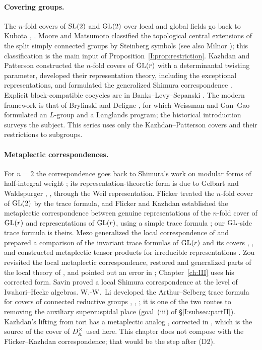 \paragraph{Covering groups.} The $n$-fold covers of $\mathrm{SL}(2)$ and $\operatorname{GL}(2)$ over local and global fields go back to Kubota \cite{Kub67}, \cite{Kub69}. Moore \cite{Moo68} and Matsumoto \cite{Mat69} classified the topological central extensions of the split simply connected groups by Steinberg symbols (see also Milnor \cite{Mil71}); this classification is the main input of Proposition~\ref{I:prop:restriction}. Kazhdan and Patterson \cite{KP84} constructed the $n$-fold covers of $\operatorname{GL}(r)$ with a determinantal twisting parameter, developed their representation theory, including the exceptional representations, and formulated the generalized Shimura correspondence \cite{KP86}. Explicit block-compatible cocycles are in Banks--Levy--Sepanski \cite{BLS99}. The modern framework is that of Brylinski and Deligne \cite{BD01}, for which Weissman \cite{Wei18} and Gan--Gao \cite{GG18} formulated an $L$-group and a Langlands program; the historical introduction \cite{GGW18} surveys the subject. This series uses only the Kazhdan--Patterson covers and their restrictions to subgroups.

\paragraph{Metaplectic correspondences.} For $n=2$ the correspondence goes back to Shimura's work on modular forms of half-integral weight \cite{Shi73}; its representation-theoretic form is due to Gelbart \cite{Gel76} and Waldspurger \cite{Wal80}, \cite{Wal91}, through the Weil representation. Flicker \cite{Fli80} treated the $n$-fold cover of $\operatorname{GL}(2)$ by the trace formula, and Flicker and Kazhdan \cite{FK86} established the metaplectic correspondence between genuine representations of the $n$-fold cover of $\operatorname{GL}(r)$ and representations of $\operatorname{GL}(r)$, using a simple trace formula \cite[\S18]{FK86}; our $\operatorname{GL}$-side trace formula is theirs. Mezo generalized the local correspondence of \cite{FK86} and prepared a comparison of the invariant trace formulas of $\operatorname{GL}(r)$ and its covers \cite{Mez02}, \cite{Mez01}, and constructed metaplectic tensor products for irreducible representations \cite{Mez04}. Zou \cite{Zo23} revisited the local metaplectic correspondence, restored and generalized parts of the local theory of \cite{FK86}, and pointed out an error in \cite[\S26.2]{FK86}; Chapter~\ref{ch:III} uses his corrected form. Savin \cite{Sav88} proved a local Shimura correspondence at the level of Iwahori--Hecke algebras. W.-W.~Li developed the Arthur--Selberg trace formula for covers of connected reductive groups \cite{Li10}, \cite{Li12}, \cite{Li14}; it is one of the two routes to removing the auxiliary supercuspidal place (goal~(iii) of \S\ref{I:subsec:partII}). Kazhdan's lifting from tori \cite{Kaz84} has a metaplectic analog \cite{Jo88}, corrected in \cite{JC26a}, which is the source of the cover of $D^\times_{\mathbb A}$ used here. This chapter does not compose with the Flicker--Kazhdan correspondence; that would be the step after (D2).

